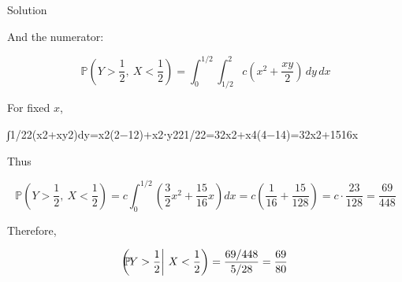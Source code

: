 \documentclass{qlnotes-export}
\begin{document}
\begin{qlsolution}{Solution}
\begin{itemize}
  And the numerator:

  \[{\mathbb{P}}\left( {Y > \frac{1}{2},\ X < \frac{1}{2}} \right) = \int_{0}^{1/2}\int_{1/2}^{2}c\left( {x^{2} + \frac{xy}{2}} \right)\, dy\, dx\]

  For fixed \(x\),

  {∫1/22(x2+xy2)dy=x2(2−12)+x2⋅y221/22=32x2+x4(4−14)=32x2+1516x}

  Thus

  \[{\mathbb{P}}\left( {Y > \frac{1}{2},\ X < \frac{1}{2}} \right) = c\int_{0}^{1/2}\left( {\frac{3}{2}x^{2} + \frac{15}{16}x} \right)dx = c\left( {\frac{1}{16} + \frac{15}{128}} \right) = c \cdot \frac{23}{128} = \frac{69}{448}\]

  Therefore,

  \[{\mathbb{P}}\mspace{-18mu}\left( Y > \frac{1}{2} \middle| \ X < \frac{1}{2} \right) = \frac{69/448}{5/28} = \frac{69}{80}\]
\end{itemize}

\end{qlsolution}
\end{document}
